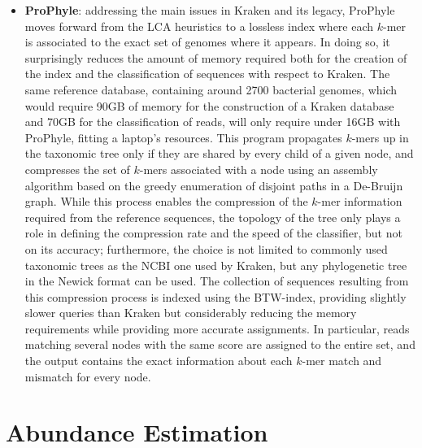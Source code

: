 \begin{itemize}
    \item \textbf{ProPhyle}: addressing the main issues in Kraken and its legacy, ProPhyle moves forward from the LCA heuristics to a lossless index where each $k$-mer is associated to the exact set of genomes where it appears. In doing so, it surprisingly reduces the amount of memory required both for the creation of the index and the classification of sequences with respect to Kraken. The same reference database, containing around 2700 bacterial genomes, which would require 90GB of memory for the construction of a Kraken database and 70GB for the classification of reads, will only require under 16GB with ProPhyle, fitting a laptop's resources. This program propagates $k$-mers up in the taxonomic tree only if they are shared by every child of a given node, and compresses the set of $k$-mers associated with a node using an assembly algorithm based on the greedy enumeration of disjoint paths in a De-Bruijn graph. While this process enables the compression of the $k$-mer information required from the reference sequences, the topology of the tree only plays a role in defining the compression rate and the speed of the classifier, but not on its accuracy; furthermore, the choice is not limited to commonly used taxonomic trees as the NCBI one used by Kraken, but any phylogenetic tree in the Newick format can be used. The collection of sequences resulting from this compression process is indexed using the BTW-index, providing slightly slower queries than Kraken but considerably reducing the memory requirements while providing more accurate assignments. In particular, reads matching several nodes with the same score are assigned to the entire set, and the output contains the exact information about each $k$-mer match and mismatch for every node.
\end{itemize}

\section{Abundance Estimation}

